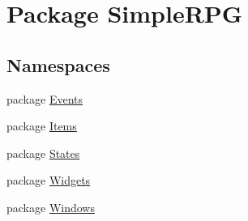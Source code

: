 \hypertarget{namespace_simple_r_p_g}{\section{Package Simple\-R\-P\-G}
\label{namespace_simple_r_p_g}
}
\subsection*{Namespaces}
\begin{DoxyCompactItemize}
\item 
package \hyperlink{namespace_simple_r_p_g_1_1_events}{Events}
\item 
package \hyperlink{namespace_simple_r_p_g_1_1_items}{Items}
\item 
package \hyperlink{namespace_simple_r_p_g_1_1_states}{States}
\item 
package \hyperlink{namespace_simple_r_p_g_1_1_widgets}{Widgets}
\item 
package \hyperlink{namespace_simple_r_p_g_1_1_windows}{Windows}
\end{DoxyCompactItemize}
